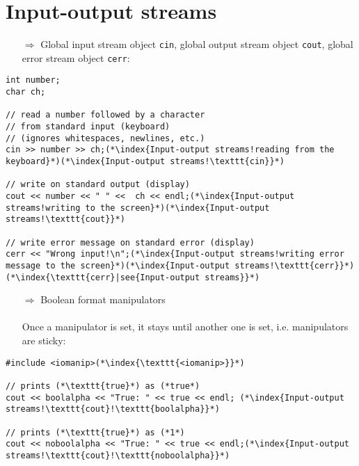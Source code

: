 \documentclass[10pt]{article}
\begin{document}
\section{Input-output streams}
\small
\begin{enumerate}
\item[$\Rightarrow$] Global  input stream object \texttt{cin}, global output stream object \texttt{cout}, global error stream object \texttt{cerr}:
\end{enumerate}
\begin{lstlisting}
int number;
char ch;

// read a number followed by a character
// from standard input (keyboard)
// (ignores whitespaces, newlines, etc.)
cin >> number >> ch;(*\index{Input-output streams!reading from the keyboard}*)(*\index{Input-output streams!\texttt{cin}}*)

// write on standard output (display)
cout << number << " " <<  ch << endl;(*\index{Input-output streams!writing to the screen}*)(*\index{Input-output streams!\texttt{cout}}*)

// write error message on standard error (display)
cerr << "Wrong input!\n";(*\index{Input-output streams!writing error message to the screen}*)(*\index{Input-output streams!\texttt{cerr}}*)(*\index{\texttt{cerr}|see{Input-output streams}}*)
\end{lstlisting}
\begin{enumerate}
\item[$\Rightarrow$] Boolean format manipulators\\ \\ Once a  manipulator is set, it stays until another one is set, i.e. manipulators are sticky:
\end{enumerate}
\begin{lstlisting}
#include <iomanip>(*\index{\texttt{<iomanip>}}*)

// prints (*\texttt{true}*) as (*true*)
cout << boolalpha << "True: " << true << endl; (*\index{Input-output streams!\texttt{cout}!\texttt{boolalpha}}*)

// prints (*\texttt{true}*) as (*1*)
cout << noboolalpha << "True: " << true << endl;(*\index{Input-output streams!\texttt{cout}!\texttt{noboolalpha}}*)
\end{lstlisting}
\end{document}
